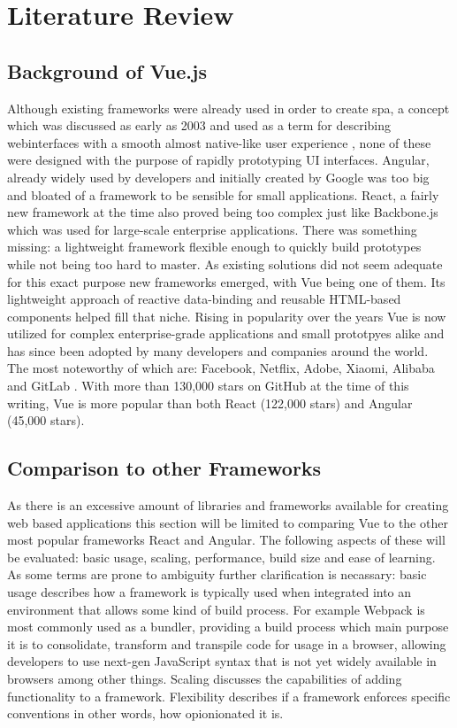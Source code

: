 \chapter[Literature Review]{Literature Review}

\section{Background of Vue.js}
Although existing frameworks were already used in order to create \acrlong{spa}, a concept which was discussed as early as 2003 \cite{Innerbro19:online} and used as a term for describing webinterfaces with a smooth almost native-like user experience \cite{Mikowski:Powell:2013}, none of these were designed with the purpose of rapidly prototyping UI interfaces. Angular, already widely used by developers and initially created by Google was too big and bloated of a framework to be sensible for small applications. React, a fairly new framework at the time also proved being too complex just like Backbone.js which was used for large-scale enterprise applications. There was something missing: a lightweight framework flexible enough to quickly build prototypes while not being too hard to master. As existing solutions did not seem adequate for this exact purpose \cite[p.~10]{filipova2016learning} new frameworks emerged, with Vue being one of them. Its lightweight approach of reactive data-binding and reusable HTML-based components helped fill that niche. Rising in popularity over the years Vue is now utilized for complex enterprise-grade applications and small prototpyes alike and has since been adopted by many developers and companies around the world. The most noteworthy of which are: Facebook, Netflix, Adobe, Xiaomi, Alibaba and GitLab \cite{CompaniesUsingVue:online}. With more than 130,000 stars on GitHub at the time of this writing, Vue is more popular than both React (122,000 stars) and Angular (45,000 stars).


\section{Comparison to other Frameworks}
As there is an excessive amount of libraries and frameworks available for creating web based applications this section will be limited to comparing Vue to the other most popular frameworks React and Angular. The following aspects of these will be evaluated: basic usage, scaling, performance, build size and ease of learning. As some terms are prone to ambiguity further clarification is necassary: basic usage describes how a framework is typically used when integrated into an environment that allows some kind of build process. For example Webpack is most commonly used as a bundler, providing a build process which main purpose it is to consolidate, transform and transpile code for usage in a browser, allowing developers to use next-gen JavaScript syntax that is not yet widely available in browsers among other things. Scaling discusses the capabilities of adding functionality to a framework. Flexibility describes if a framework enforces specific conventions in other words, how opionionated it is.

